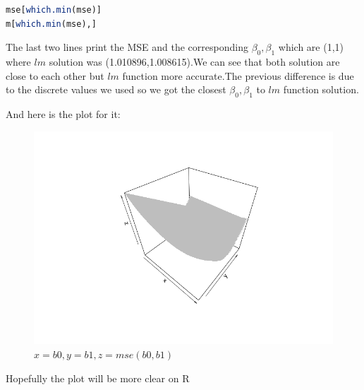 \documentclass{article}
\begin{document}
\begin{multicols*}{2}
\begin{flushleft}
\begin{lstlisting}[language=R]
mse[which.min(mse)]
m[which.min(mse),]
\end{lstlisting}
\begin{flushleft}
	The last two lines print the MSE and the corresponding \(\beta_0,\beta_1\) which are (1,1) where \(lm\) solution was (1.010896,1.008615).We can see that both solution are close to each other but  \(lm\) function more accurate.The previous difference is due to the discrete values we used so we got the closest \(\beta_0,\beta_1\) to \(lm\) function solution.
\end{flushleft}
And here is the plot for it:
\begin{figure}[H]
\begin{center}
	\includegraphics[scale=0.4]{plot3d.png}
\end{center}
\caption{\(x=b0,y=b1,z=mse(b0,b1)\)}
\end{figure}
Hopefully the plot will be more clear on R


\end{flushleft}
\end{multicols*}
\end{document}
